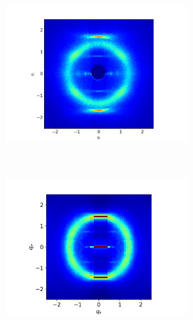 \documentclass{article}
\begin{document}
  \begin{figure}[ht]
  \begin{subfigure}{.83\linewidth}
        \centering
        \begin{subfigure}{0.4\linewidth}
                \centering
                \includegraphics[width=\linewidth, trim={2.5cm 0 4cm 2cm}, clip]{WAXS_raw.png}%
                \caption{}~\label{fig:raw_waxs}
        \end{subfigure}%
        \begin{subfigure}{0.4\linewidth}
                \centering
                \includegraphics[width=\linewidth, trim={2cm 0 2.5cm 1.25cm}, clip]{rzplot_offset.png}
                \caption{}~\label{fig:rz_offset}
        \end{subfigure}

\end{subfigure}
\end{figure}
\end{document}
